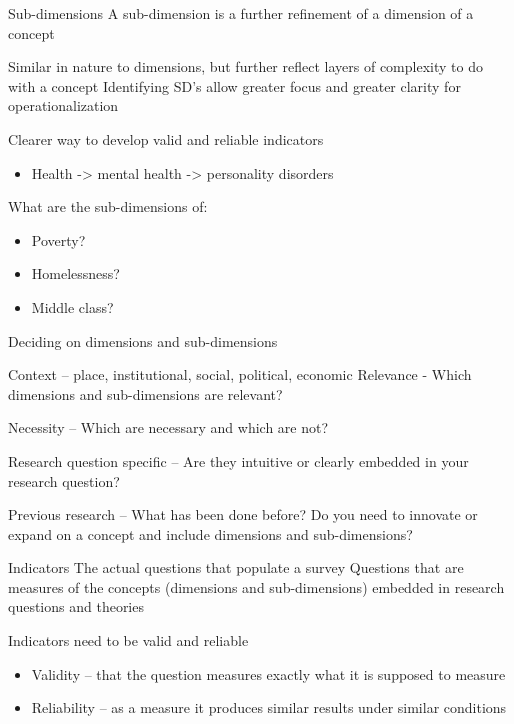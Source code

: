 \documentclass[slidestop,compress,mathserif,12pt,t,professionalfonts,xcolor=table]{beamer}
\begin{document}
\begin{frame}{Sub-dimensions}
A sub-dimension is a further refinement of a dimension of a concept 

Similar in nature to dimensions, but further reflect layers of complexity to do with a concept 
Identifying SD’s allow greater focus and greater clarity for operationalization

Clearer way to develop valid and reliable indicators
\begin{itemize}
 
\item Health ->  mental health  ->  personality disorders

\end{itemize}

What are the sub-dimensions of:

\begin{itemize}
\item Poverty? 
\item Homelessness?
\item Middle class?

\end{itemize}
\end{frame}

\begin{frame}{Deciding on dimensions and sub-dimensions}


Context – place, institutional, social, political, economic
Relevance  - Which dimensions and sub-dimensions are relevant?

Necessity – Which are necessary and which are not?

Research question specific – Are they intuitive or clearly embedded in your research question?

Previous research – What has been done before? Do you need to innovate or expand on a concept and include dimensions and sub-dimensions?
\end{frame}


\begin{frame}{
Indicators}
The actual questions that populate a survey 
Questions that are measures of the concepts (dimensions and sub-dimensions) embedded in research questions and theories


Indicators need to be valid and reliable 

\begin{itemize}
\item Validity – that the question measures exactly what it is supposed to measure
\item Reliability – as a measure it produces similar results under similar conditions 
\end{itemize}

\end{frame}
\end{document}
